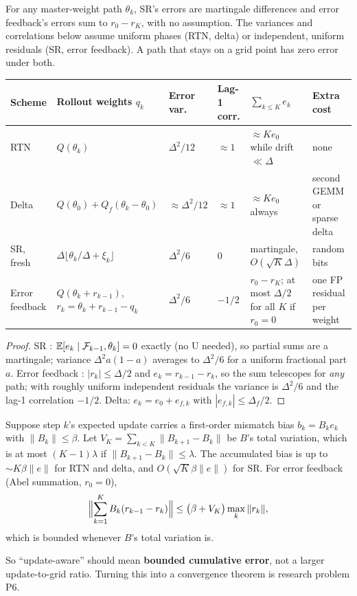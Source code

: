 \documentclass[11pt]{article}
\begin{document}
\begin{proposition}\label{prop:schemes}
For any master-weight path $\theta_k$, SR's errors are martingale differences and error feedback's errors sum to $r_0-r_K$, with no assumption. The variances and correlations below assume uniform phases (RTN, delta) or independent, uniform residuals (SR, error feedback). A path that stays on a grid point has zero error under both.
\begin{center}\small
\begin{tabularx}{\linewidth}{@{}l L l l L L@{}}
\toprule
Scheme & Rollout weights $q_k$ & Error var. & Lag-1 corr. & $\sum_{k\le K}e_k$ & Extra cost\\
\midrule
RTN & $Q(\theta_k)$ & $\Delta^2/12$ & $\approx1$ & $\approx Ke_0$ while drift $\ll\Delta$ & none\\
Delta & $Q(\theta_0)+Q_f(\theta_k-\theta_0)$ & $\approx\Delta^2/12$ & $\approx1$ & $\approx Ke_0$ always & second GEMM or sparse delta\\
SR, fresh & $\Delta\lfloor\theta_k/\Delta+\xi_k\rfloor$ & $\Delta^2/6$ & 0 & martingale, $O(\sqrt K\Delta)$ & random bits\\
Error feedback & $Q(\theta_k+r_{k-1})$, $r_k=\theta_k+r_{k-1}-q_k$ & $\Delta^2/6$ & $-1/2$ & $r_0-r_K$; at most $\Delta/2$ for all $K$ if $r_0=0$ & one FP residual per weight\\
\bottomrule
\end{tabularx}
\end{center}
\end{proposition}
\begin{proof}
SR \citep{gupta2015limited}: $\mathbb{E}[e_k\mid\mathcal F_{k-1},\theta_k]=0$ exactly (no U needed), so partial sums are a martingale; variance $\Delta^2a(1-a)$ averages to $\Delta^2/6$ for a uniform fractional part $a$. Error feedback \citep{gray1990spectra,seide2014onebit,stich2018sparsified,karimireddy2019ef}: $|r_k|\le\Delta/2$ and $e_k=r_{k-1}-r_k$, so the sum telescopes for \emph{any} path; with roughly uniform independent residuals the variance is $\Delta^2/6$ and the lag-1 correlation $-1/2$. Delta: $e_k=e_0+e_{f,k}$ with $|e_{f,k}|\le\Delta_f/2$.
\end{proof}

\begin{corollary}\label{cor:partial-sums}
Suppose step $k$'s expected update carries a first-order mismatch bias $b_k=B_ke_k$ with $\|B_k\|\le\beta$. Let $V_K=\sum_{k<K}\|B_{k+1}-B_k\|$ be $B$'s total variation, which is at most $(K-1)\lambda$ if $\|B_{k+1}-B_k\|\le\lambda$. The accumulated bias is up to ${\sim}K\beta\|e\|$ for RTN and delta, and $O(\sqrt K\beta\|e\|)$ for SR. For error feedback (Abel summation, $r_0=0$),
\[
\Bigl\|\sum_{k=1}^K B_k(r_{k-1}-r_k)\Bigr\|\le\bigl(\beta+V_K\bigr)\max_k\|r_k\|,
\]
which is bounded whenever $B$'s total variation is.
\end{corollary}
So ``update-aware'' should mean \textbf{bounded cumulative error}, not a larger update-to-grid ratio. Turning this into a convergence theorem is research problem P6.
\end{document}
